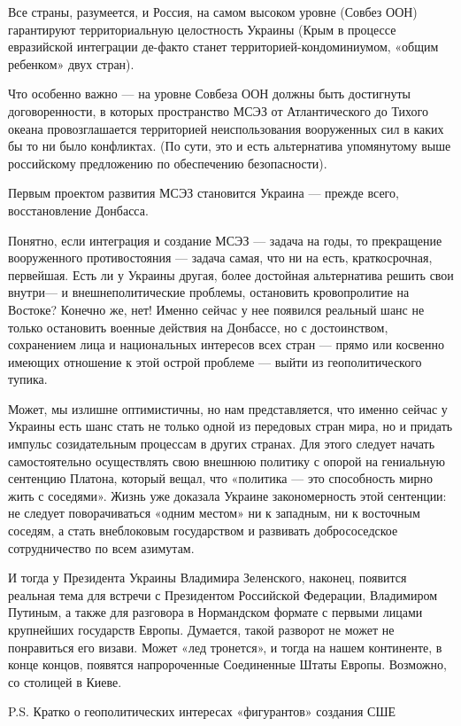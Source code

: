 Все страны, разумеется, и Россия, на самом высоком уровне (Совбез ООН)
гарантируют территориальную целостность Украины (Крым в процессе евразийской
интеграции де-факто станет территорией-кондоминиумом, «общим ребенком» двух
стран).

Что особенно важно — на уровне Совбеза ООН должны быть достигнуты
договоренности, в которых пространство МСЭЗ от Атлантического до Тихого океана
провозглашается территорией неиспользования вооруженных сил в каких бы то ни
было конфликтах. (По сути, это и есть альтернатива упомянутому выше российскому
предложению по обеспечению безопасности).

Первым проектом развития МСЭЗ становится Украина — прежде всего, восстановление
Донбасса.

Понятно, если интеграция и создание МСЭЗ — задача на годы, то прекращение
вооруженного противостояния — задача самая, что ни на есть, краткосрочная,
первейшая. Есть ли у Украины другая, более достойная альтернатива решить свои
внутри— и внешнеполитические проблемы, остановить кровопролитие на Востоке?
Конечно же, нет! Именно сейчас у нее появился реальный шанс не только
остановить военные действия на Донбассе, но с достоинством, сохранением лица и
национальных интересов всех стран — прямо или косвенно имеющих отношение к этой
острой проблеме — выйти из геополитического тупика.

Может, мы излишне оптимистичны, но нам представляется, что именно сейчас у
Украины есть шанс стать не только одной из передовых стран мира, но и придать
импульс созидательным процессам в других странах. Для этого следует начать
самостоятельно осуществлять свою внешнюю политику с опорой на гениальную
сентенцию Платона, который вещал, что «политика — это способность мирно жить с
соседями». Жизнь уже доказала Украине закономерность этой сентенции: не следует
поворачиваться «одним местом» ни к западным, ни к восточным соседям, а стать
внеблоковым государством и развивать добрососедское сотрудничество по всем
азимутам.

И тогда у Президента Украины Владимира Зеленского, наконец, появится реальная
тема для встречи с Президентом Российской Федерации, Владимиром Путиным, а
также для разговора в Нормандском формате с первыми лицами крупнейших
государств Европы. Думается, такой разворот не может не понравиться его визави.
Может «лед тронется», и тогда на нашем континенте, в конце концов, появятся
напророченные Соединенные Штаты Европы. Возможно, со столицей в Киеве.

P.S. Кратко о геополитических интересах «фигурантов» создания СШЕ

